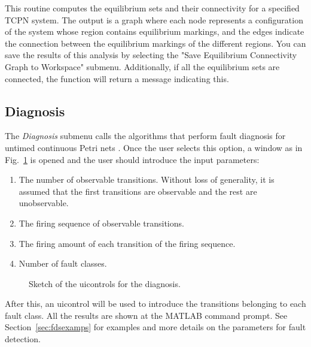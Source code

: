 This routine computes the equilibrium sets and their connectivity for a specified TCPN system. The output is a graph where each node represents a configuration of the system whose region contains equilibrium markings, and the edges indicate the connection between the equilibrium markings of the different regions. You can save the results of this analysis by selecting the "Save Equilibrium Connectivity Graph to Workspace" submenu. Additionally, if all the equilibrium sets are connected, the function will return a message indicating this.
\subsection{Diagnosis}


The \emph{Diagnosis} submenu calls the algorithms that perform fault diagnosis for untimed continuous Petri nets \cite{ARMASECASI12}. Once the user selects this option, a window as in Fig.~\ref{fig:diag} is opened and the user should introduce the input parameters:
\begin{enumerate}
\item The number of observable transitions. Without loss of generality, it is assumed that the first transitions are observable and the rest are unobservable.
\item The firing sequence of observable transitions.
\item The firing amount of each transition of the firing sequence.
\item Number of fault classes.
\end{enumerate}


\begin{figure}[!htb]
   \caption[htb!]{Sketch of the uicontrols for the diagnosis.}\label{fig:diag}
\end{figure}

After this, an uicontrol will be used to introduce the transitions belonging to each fault class. All the results are shown at the MATLAB command prompt. See Section~\ref{sec:fdsexamps} for examples and more details on the parameters for fault detection.


